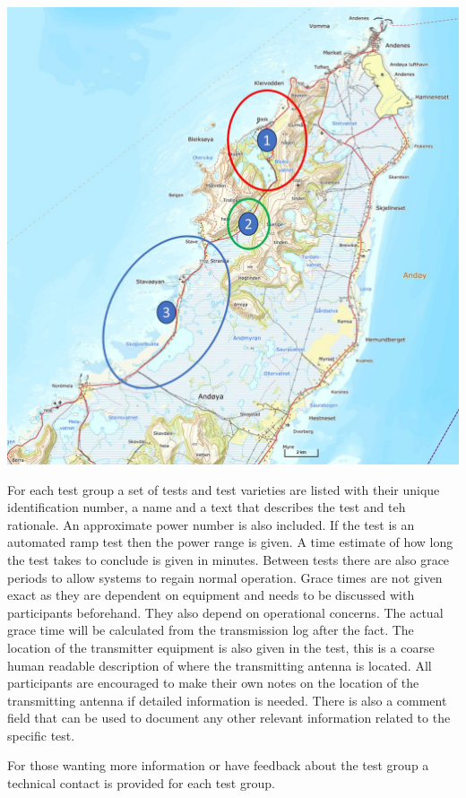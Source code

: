 \documentclass[a4paper]{book}
\begin{document}
\includegraphics[scale=0.4]{graphics/locations.png}

For each test group a set of tests and test varieties are listed with their unique identification number, a name and a text that describes the test and teh rationale. An approximate power number is also included. If the test is an automated ramp test then the power range is given. A time estimate of how long the test takes to conclude is given in minutes. Between tests there are also grace periods to allow systems to regain normal operation. Grace  times are not given exact as they are dependent on equipment and needs to be discussed with participants beforehand. They also depend on operational concerns. The actual grace time will be calculated from the transmission log after the fact. The location of the transmitter equipment is also given in the test, this is a coarse human readable description of where the transmitting antenna is located. All participants are encouraged to make their own notes on the location of the transmitting antenna if detailed information is needed. There is also a comment field that can be used to document any other relevant information related to the specific test. 

\newline

For those wanting more information or have feedback about the test group a technical contact is provided for each test group. 


\end{document}
